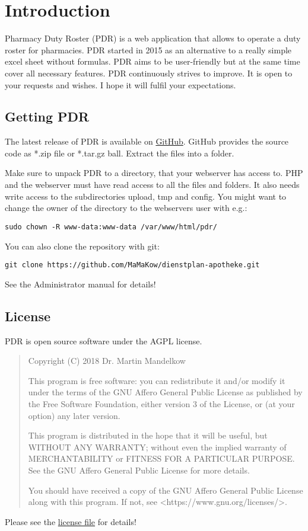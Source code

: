 \chapter{Introduction}
Pharmacy Duty Roster (PDR) is a web application that allows to operate a duty roster for pharmacies.
PDR started in 2015 as an alternative to a really simple excel sheet without formulas.
PDR aims to be user-friendly but at the same time cover all necessary features.
PDR continuously strives to improve. It is open to your requests and wishes.
I hope it will fulfil your expectations.

\section{Getting PDR}
The latest release of PDR is available on \href{https://github.com/MaMaKow/dienstplan-apotheke/releases/latest}{GitHub}. GitHub provides the source code as *.zip file or *.tar.gz ball. Extract the files into a folder.

Make sure to unpack PDR to a directory, that your webserver has access to. PHP and the webserver must have read access to all the files and folders. It also needs write access to the subdirectories upload, tmp and config. You might want to change the owner of the directory to the webservers user with e.g.:

\begin{lstlisting}
sudo chown -R www-data:www-data /var/www/html/pdr/
\end{lstlisting}

You can also clone the repository with git:
\begin{lstlisting}
git clone https://github.com/MaMaKow/dienstplan-apotheke.git
\end{lstlisting}
See the Administrator manual for details!

\section{License}
PDR is open source software under the AGPL license.
\begin{quote}
	Copyright (C) 2018  Dr. Martin Mandelkow
	
	This program is free software: you can redistribute it and/or modify
	it under the terms of the GNU Affero General Public License as
	published by the Free Software Foundation, either version 3 of the
	License, or (at your option) any later version.
	
	This program is distributed in the hope that it will be useful,
	but WITHOUT ANY WARRANTY; without even the implied warranty of
	MERCHANTABILITY or FITNESS FOR A PARTICULAR PURPOSE.  See the
	GNU Affero General Public License for more details.
	
	You should have received a copy of the GNU Affero General Public License
	along with this program.  If not, see <https://www.gnu.org/licenses/>.
	
\end{quote}
 Please see the \href{https://github.com/MaMaKow/dienstplan-apotheke/blob/master/LICENSE.md}{license file} for details!

